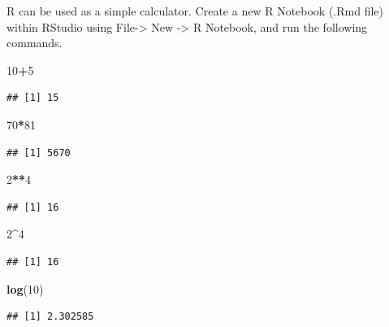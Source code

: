 \documentclass[]{book}
\newenvironment{Shaded}{\begin{snugshade}}{\end{snugshade}}
\newcommand{\KeywordTok}[1]{\textcolor[rgb]{0.13,0.29,0.53}{\textbf{#1}}}
\newcommand{\DecValTok}[1]{\textcolor[rgb]{0.00,0.00,0.81}{#1}}
\newcommand{\OperatorTok}[1]{\textcolor[rgb]{0.81,0.36,0.00}{\textbf{#1}}}
\newcommand{\NormalTok}[1]{#1}
\theoremstyle{definition}
\theoremstyle{definition}
\theoremstyle{definition}
\theoremstyle{remark}
\begin{document}
R can be used as a simple calculator. Create a new R Notebook (.Rmd
file) within RStudio using File-\textgreater{} New -\textgreater{} R
Notebook, and run the following commands.

\begin{Shaded}
\begin{Highlighting}[]
\DecValTok{10}\OperatorTok{+}\DecValTok{5} 
\end{Highlighting}
\end{Shaded}

\begin{verbatim}
## [1] 15
\end{verbatim}

\begin{Shaded}
\begin{Highlighting}[]
\DecValTok{70}\OperatorTok{*}\DecValTok{81}
\end{Highlighting}
\end{Shaded}

\begin{verbatim}
## [1] 5670
\end{verbatim}

\begin{Shaded}
\begin{Highlighting}[]
\DecValTok{2}\OperatorTok{**}\DecValTok{4}
\end{Highlighting}
\end{Shaded}

\begin{verbatim}
## [1] 16
\end{verbatim}

\begin{Shaded}
\begin{Highlighting}[]
\DecValTok{2}\OperatorTok{^}\DecValTok{4}
\end{Highlighting}
\end{Shaded}

\begin{verbatim}
## [1] 16
\end{verbatim}

\begin{Shaded}
\begin{Highlighting}[]
\KeywordTok{log}\NormalTok{(}\DecValTok{10}\NormalTok{)                         }
\end{Highlighting}
\end{Shaded}

\begin{verbatim}
## [1] 2.302585
\end{verbatim}
\end{document}

